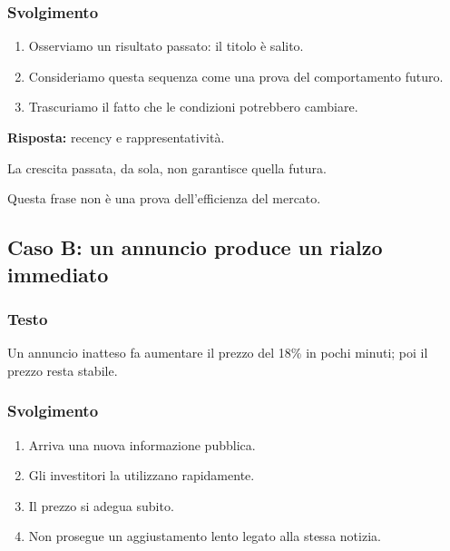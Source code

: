 \subsubsection*{Svolgimento}

\begin{enumerate}
    \item Osserviamo un risultato passato:
    il titolo è salito.

    \item Consideriamo questa sequenza
    come una prova del comportamento futuro.

    \item Trascuriamo il fatto
    che le condizioni potrebbero cambiare.
\end{enumerate}

\noindent \textbf{Risposta:}
recency e rappresentatività.

\noindent La crescita passata,
da sola, non garantisce quella futura.

\noindent Questa frase non è una prova
dell'efficienza del mercato.


\subsection{Caso B:
un annuncio produce un rialzo immediato}

\subsubsection*{Testo}

\noindent Un annuncio inatteso fa aumentare
il prezzo del 18\% in pochi minuti;
poi il prezzo resta stabile.


\subsubsection*{Svolgimento}

\begin{enumerate}
    \item Arriva una nuova informazione pubblica.

    \item Gli investitori la utilizzano rapidamente.

    \item Il prezzo si adegua subito.

    \item Non prosegue un aggiustamento lento
    legato alla stessa notizia.
\end{enumerate}

